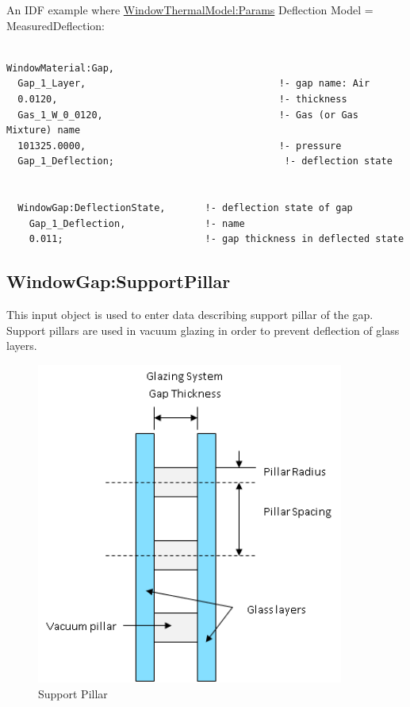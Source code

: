 An IDF example where \hyperref[windowthermalmodelparams]{WindowThermalModel:Params} Deflection Model = MeasuredDeflection:

\begin{lstlisting}

WindowMaterial:Gap,
  Gap_1_Layer,                                  !- gap name: Air
  0.0120,                                       !- thickness
  Gas_1_W_0_0120,                               !- Gas (or Gas Mixture) name
  101325.0000,                                  !- pressure
  Gap_1_Deflection;                              !- deflection state


  WindowGap:DeflectionState,       !- deflection state of gap
    Gap_1_Deflection,              !- name
    0.011;                         !- gap thickness in deflected state
\end{lstlisting}

\subsection{WindowGap:SupportPillar}\label{windowgapsupportpillar}

This input object is used to enter data describing support pillar of the gap.~ Support pillars are used in vacuum glazing in order to prevent deflection of glass layers.

\begin{figure}[hbtp] %
\centering
\includegraphics[width=0.9\textwidth, height=0.9\textheight, keepaspectratio=true]{media/image029.png}
\caption{Support Pillar \protect \label{fig:support-pillar}}
\end{figure}

